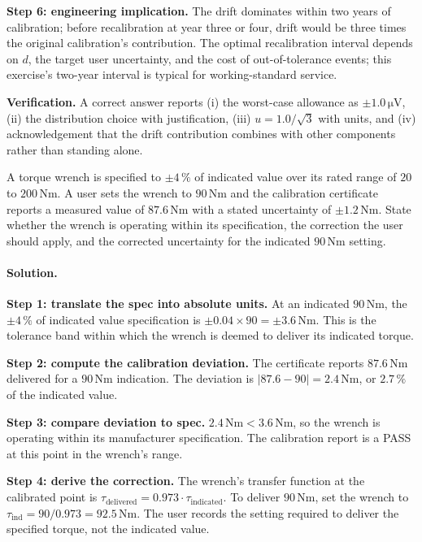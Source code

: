 \begin{exercise}
\textbf{Step 6: engineering implication.} The drift dominates
within two years of calibration; before recalibration at year three
or four, drift would be three times the original calibration's
contribution. The optimal recalibration interval depends on
$d$, the target user uncertainty, and the cost of out-of-tolerance
events; this exercise's two-year interval is typical for
working-standard service.

\textbf{Verification.} A correct answer reports (i) the worst-case
allowance as $\pm 1.0 \,\si{\micro\volt}$, (ii) the distribution
choice with justification, (iii) $u = 1.0/\sqrt{3}$ with units, and
(iv) acknowledgement that the drift contribution combines with
other components rather than standing alone.
\end{exercise}

\begin{exercise}
A torque wrench is specified to $\pm 4\,\%$ of indicated value over
its rated range of $20$ to $200 \,\si{\newton\meter}$. A user sets
the wrench to $90 \,\si{\newton\meter}$ and the calibration
certificate reports a measured value of $87.6 \,\si{\newton\meter}$
with a stated uncertainty of $\pm 1.2 \,\si{\newton\meter}$. State
whether the wrench is operating within its specification, the
correction the user should apply, and the corrected uncertainty for
the indicated $90 \,\si{\newton\meter}$ setting.

\paragraph{Solution.}
\textbf{Step 1: translate the spec into absolute units.} At an
indicated $90 \,\si{\newton\meter}$, the $\pm 4\,\%$ of indicated
value specification is $\pm 0.04 \times 90 = \pm 3.6 \,\si{\newton
\meter}$. This is the tolerance band within which the wrench is
deemed to deliver its indicated torque.

\textbf{Step 2: compute the calibration deviation.} The certificate
reports $87.6 \,\si{\newton\meter}$ delivered for a $90 \,\si{
\newton\meter}$ indication. The deviation is
$|87.6 - 90| = 2.4 \,\si{\newton\meter}$, or $2.7\,\%$ of the
indicated value.

\textbf{Step 3: compare deviation to spec.} $2.4 \,\si{\newton
\meter} < 3.6 \,\si{\newton\meter}$, so the wrench is operating
within its manufacturer specification. The calibration report is a
PASS at this point in the wrench's range.

\textbf{Step 4: derive the correction.} The wrench's transfer
function at the calibrated point is
$\tau_{\text{delivered}} = 0.973 \cdot \tau_{\text{indicated}}$.
To deliver $90 \,\si{\newton\meter}$, set the wrench to
$\tau_{\text{ind}} = 90/0.973 = 92.5 \,\si{\newton\meter}$. The
user records the setting required to deliver the specified torque,
not the indicated value.


\end{exercise}
